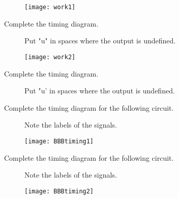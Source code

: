\begin{description}
\texttt{[image: work1]}

\item[Complete the timing diagram.]  Put "u" in spaces where the output
is undefined.

\texttt{[image: work2]} 

\item[Complete the timing diagram.]  Put "u' in spaces where the output
is undefined.


\pagebreak
\item[Complete the timing diagram for the following circuit.]
Note the labels of the signals.

\texttt{[image: BBBtiming1]}



\item[Complete the timing diagram for the following circuit.]
Note the labels of the signals.

\texttt{[image: BBBtiming2]}

\end{description}
